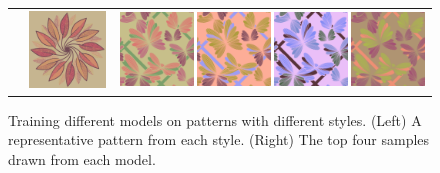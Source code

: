 \begin{figure}[t]
\begin{tabular}{ccc}
\raisebox{1.55em}{\emph{Mellow}}&\includegraphics[width=.148\columnwidth]{figs/styleResultsMellowExample}&\includegraphics[width=.62\columnwidth]{figs/styleResultsMellow}\vspace{0.5em}\\
\end{tabular}

\caption{Training different models on patterns with different styles. (Left) A representative pattern from each style. (Right) The top four samples drawn from each model.}
\label{fig:styleTraining}
\vspace{-1.0em}
\end{figure}

